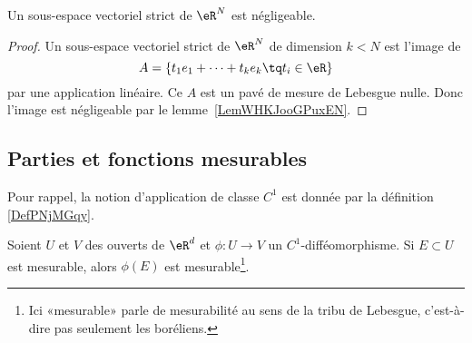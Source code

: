 												 \begin{corollary}
												 Un sous-espace vectoriel strict de \( \eR^N\) est négligeable.
												 \end{corollary}

												 \begin{proof}
												 Un sous-espace vectoriel strict de \( \eR^N\) de dimension \( k<N\) est l'image de
												 \begin{equation}
												 A=\{ t_1e_1+\cdots +t_ke_k\tq t_i\in \eR \}
												 \end{equation}
												 par une application linéaire. Ce \( A\) est un pavé de mesure de Lebesgue nulle. Donc l'image est négligeable par le lemme~\ref{LemWHKJooGPuxEN}.
												 \end{proof}

												 \subsection{Parties et fonctions mesurables}

												 Pour rappel, la notion d'application de classe \( C^1\) est donnée par la définition \ref{DefPNjMGqy}.

												 \begin{proposition}     \label{PropRDRNooFnZSKt}
												 Soient \( U\) et \( V\) des ouverts de \( \eR^d\) et \( \phi\colon U\to V\) un \( C^1\)-difféomorphisme. Si \( E\subset U\) est mesurable, alors \( \phi(E)\) est mesurable\footnote{Ici «mesurable» parle de mesurabilité au sens de la tribu de Lebesgue, c'est-à-dire pas seulement les boréliens.}.
												 \end{proposition}

